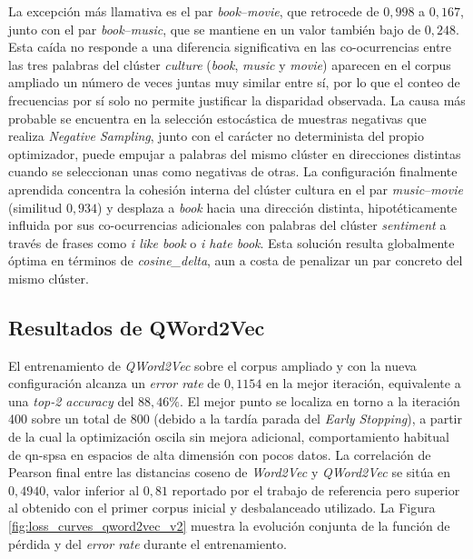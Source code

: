 La excepción más llamativa es el par \textit{book}--\textit{movie}, que retrocede de $0{,}998$ a $0{,}167$, junto con el par \textit{book}--\textit{music}, que se mantiene en un valor también bajo de $0{,}248$. Esta caída no responde a una diferencia significativa en las co-ocurrencias entre las tres palabras del clúster \textit{culture} (\textit{book}, \textit{music} y \textit{movie}) aparecen en el corpus ampliado un número de veces juntas muy similar entre sí, por lo que el conteo de frecuencias por sí solo no permite justificar la disparidad observada. La causa más probable se encuentra en la selección estocástica de muestras negativas que realiza \textit{Negative Sampling}, junto con el carácter no determinista del propio optimizador, puede empujar a palabras del mismo clúster en direcciones distintas cuando se seleccionan unas como negativas de otras. La configuración finalmente aprendida concentra la cohesión interna del clúster cultura en el par \textit{music}--\textit{movie} (similitud $0{,}934$) y desplaza a \textit{book} hacia una dirección distinta, hipotéticamente influida por sus co-ocurrencias adicionales con palabras del clúster \textit{sentiment} a través de frases como \textit{i like book} o \textit{i hate book}. Esta solución resulta globalmente óptima en términos de \textit{cosine\_delta}, aun a costa de penalizar un par concreto del mismo clúster.

\subsection{Resultados de QWord2Vec}

El entrenamiento de \textit{QWord2Vec} sobre el corpus ampliado y con la nueva configuración alcanza un \textit{error rate} de $0{,}1154$ en la mejor iteración, equivalente a una \textit{top-2 accuracy} del $88{,}46\%$. El mejor punto se localiza en torno a la iteración 400 sobre un total de 800 (debido a la tardía parada del \textit{Early Stopping}), a partir de la cual la optimización oscila sin mejora adicional, comportamiento habitual de \gls{qn-spsa} en espacios de alta dimensión con pocos datos. La correlación de Pearson final entre las distancias coseno de \textit{Word2Vec} y \textit{QWord2Vec} se sitúa en $0{,}4940$, valor inferior al $0{,}81$ reportado por el trabajo de referencia \cite{ohno_qword2vec_2025} pero superior al obtenido con el primer corpus inicial y desbalanceado utilizado. La Figura \ref{fig:loss_curves_qword2vec_v2} muestra la evolución conjunta de la función de pérdida y del \textit{error rate} durante el entrenamiento.

